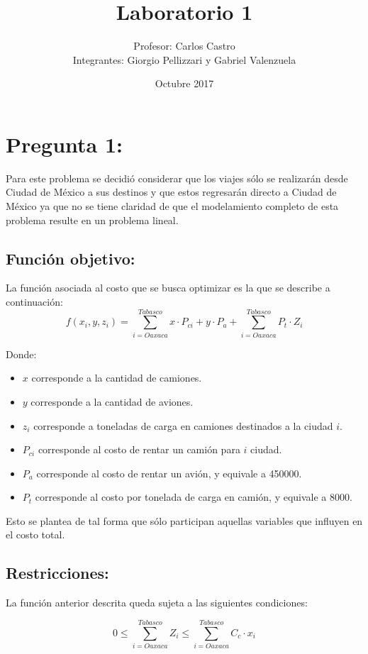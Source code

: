 \documentclass[]{article}
\title{Laboratorio 1}
\author{Profesor: Carlos Castro\\ 
        Integrantes: Giorgio Pellizzari y Gabriel Valenzuela}
\date{Octubre 2017}
\begin{document}
\maketitle
\thispagestyle{fancy}

\section{Pregunta 1:}

Para este problema se decidió considerar que los viajes sólo se realizarán desde Ciudad de México a sus destinos y que estos regresarán directo a Ciudad de México ya que no se tiene claridad de que el modelamiento completo de esta problema resulte en un problema lineal.

\subsection{Función objetivo:}
La función asociada al costo que se busca optimizar es la que se describe a continuación:
$$f(x_i,y,z_i)= \sum_{i=Oaxaca}^{Tabasco}x\cdot{}P_{ci}+y\cdot{}P_a+\sum_{i=Oaxaca}^{Tabasco}{P_t\cdot{}Z_i}$$

\par Donde:
\begin{itemize}
    \item $x$ corresponde a la cantidad de camiones.
    \item $y$ corresponde a la cantidad de aviones.
    \item $z_i$ corresponde a toneladas de carga en camiones destinados a la ciudad $i$.
    \item $P_{ci}$ corresponde al costo de rentar un camión para $i$ ciudad.
    \item $P_a$ corresponde al costo de rentar un avión, y equivale a 450000.
    \item $P_t$ corresponde al costo por tonelada de carga en camión, y equivale a 8000.
\end{itemize}

Esto se plantea de tal forma que sólo participan aquellas variables que influyen en el costo total.

\subsection{Restricciones:}
La función anterior descrita queda sujeta a las siguientes condiciones:

$$0\leq \sum_{i=Oaxaca}^{Tabasco}Z_i \leq \sum_{i=Oaxaca}^{Tabasco}C_c\cdot x_i$$
\end{document}
